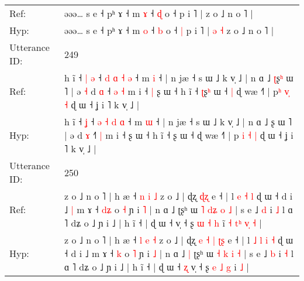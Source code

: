 \documentclass[10pt]{article}
\DeclareRobustCommand{\hl}[1]{{\textcolor{red}{#1}}}
\begin{document}
\begin{longtable}{ll}
Ref: & əəə… s e ˧ pʰ ɤ ˧ m \hl{ɤ} ˧ \hl{ɖ} o ˧\hl{}\hl{} p i ˥ |\hl{}\hl{}\hl{}\hl{} z o ˩ n o ˥ |
 \\
Hyp: & əəə… s e ˧ pʰ ɤ ˧ m \hl{o} ˧ \hl{b} o ˧\hl{ }\hl{|} p i ˥ |\hl{ }\hl{ə}\hl{ }\hl{˧} z o ˩ n o ˥ |
 \\
\midrule
Utterance ID: & 249 \\
Ref: & h ĩ ˧\hl{ }\hl{|} \hl{ə} ˧ \hl{d} \hl{ɑ} \hl{˧} \hl{ə} ˧ m \hl{i} ˧ | n jæ ˧ s ɯ ˩ k v̩ ˩ | n ɑ ˩ \hl{ʈ}ʂ\hl{ʰ} ɯ ˥ | ə\hl{ }\hl{˧} d \hl{ɑ} ˧\hl{ }\hl{ə} \hl{˧} m i ˧\hl{ }\hl{|} ʂ ɯ ˧ h ĩ ˧ \hl{ʈ}ʂ\hl{ʰ} ɯ ˧\hl{ }\hl{|} ɖ wæ ˧˥ | p\hl{ʰ}\hl{ }\hl{v}\hl{̩} \hl{˧} ɖ ɯ ˧ ʝ i ˥ k v̩ ˩ |
 \\
Hyp: & h ĩ ˧\hl{}\hl{} \hl{ʝ} ˧ \hl{ə} \hl{˧} \hl{d} \hl{ɑ} ˧ m \hl{ɯ} ˧ | n jæ ˧ s ɯ ˩ k v̩ ˩ | n ɑ ˩ \hl{}ʂ\hl{} ɯ ˥ | ə\hl{}\hl{} d \hl{ɤ} ˧\hl{}\hl{˥} \hl{|} m i ˧\hl{}\hl{} ʂ ɯ ˧ h ĩ ˧ \hl{}ʂ\hl{} ɯ ˧\hl{}\hl{} ɖ wæ ˧˥ | p\hl{ }\hl{i}\hl{ }\hl{˧} \hl{|} ɖ ɯ ˧ ʝ i ˥ k v̩ ˩ |
 \\
\midrule
Utterance ID: & 250 \\
Ref: & z o ˩ n o ˥ | h æ ˧ \hl{n} \hl{i} \hl{˩} z o ˩ | ɖʐ\hl{}\hl{}\hl{}\hl{}\hl{}\hl{} \hl{ɖ}\hl{ʐ} e ˧ | l\hl{}\hl{} \hl{e} \hl{˧} \hl{l} ɖ ɯ ˧ d i ˩\hl{ }\hl{|} m ɤ ˧ \hl{d}\hl{ʑ} o \hl{˧} ɲ i \hl{˥} | n ɑ ˩\hl{}\hl{} ʈʂʰ ɯ \hl{˥} \hl{d}\hl{ʑ} \hl{o} \hl{˩} | s e ˩ \hl{d} i \hl{˩} l ɑ ˥ dʑ o ˩ ɲ i ˩ | h ĩ ˧ | ɖ ɯ ˧\hl{}\hl{} v̩ ˧ ʂ \hl{ɯ} \hl{˧} \hl{h} i\hl{̃}\hl{ }\hl{˧}\hl{ }\hl{t}\hl{ʰ}\hl{ }\hl{v}\hl{̩} \hl{˧} |
 \\
Hyp: & z o ˩ n o ˥ | h æ ˧ \hl{l} \hl{e} \hl{˧} z o ˩ | ɖʐ\hl{ }\hl{e}\hl{ }\hl{˧}\hl{ }\hl{|} \hl{ʈ}\hl{ʂ} e ˧ | l\hl{ }\hl{˩} \hl{l} \hl{i} \hl{˧} ɖ ɯ ˧ d i ˩\hl{}\hl{} m ɤ ˧ \hl{}\hl{k} o \hl{˥} ɲ i \hl{˩} | n ɑ ˩\hl{ }\hl{|} ʈʂʰ ɯ \hl{˧} \hl{}\hl{k} \hl{i} \hl{˧} | s e ˩ \hl{b} i \hl{˧} l ɑ ˥ dʑ o ˩ ɲ i ˩ | h ĩ ˧ | ɖ ɯ ˧\hl{ }\hl{ʐ} v̩ ˧ ʂ \hl{e} \hl{˩} \hl{g} i\hl{}\hl{}\hl{}\hl{}\hl{}\hl{}\hl{}\hl{}\hl{} \hl{˩} |
 \\
\midrule
\end{longtable}
\end{document}
